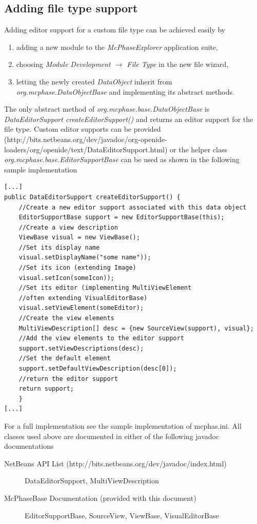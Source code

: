 \documentclass[11pt]{article}
\begin{document}
\subsection{Adding file type support}
Adding editor support for a custom file type can be achieved easily by 
\begin{enumerate}
\item adding a new module to the \emph{McPhaseExplorer} application suite,
\item choosing \emph{Module Development $\rightarrow$ File Type} in the new file wizard,
\item letting the newly created \emph{DataObject} inherit from \emph{org.mcphase.DataObjectBase} and implementing its abstract methods.
\end{enumerate}
The only abstract method of \emph{org.mcphase.base.DataObjectBase} is \emph{DataEditorSupport createEditorSupport()} and returns an editor support for the file type. Custom editor supports can be provided (http://bits.netbeans.org/dev/javadoc/org-openide-loaders/org/openide/text/DataEditorSupport.html) or the helper class \emph{org.mcphase.base.EditorSupportBase} can be used as shown in the following sample implementation
\begin{verbatim}
[...]
public DataEditorSupport createEditorSupport() {
    //Create a new editor support associated with this data object
    EditorSupportBase support = new EditorSupportBase(this);
    //Create a view description
    ViewBase visual = new ViewBase();
    //Set its display name
    visual.setDisplayName("some name"));
    //Set its icon (extending Image)
    visual.setIcon(someIcon));
    //Set its editor (implementing MultiViewElement 
    //often extending VisualEditorBase)
    visual.setViewElement(someEditor);
    //Create the view elements
    MultiViewDescription[] desc = {new SourceView(support), visual};
    //Add the view elements to the editor support
    support.setViewDescriptions(desc);
    //Set the default element
    support.setDefaultViewDescription(desc[0]);
    //return the editor support
    return support;
    }
[...]
\end{verbatim}
For a full implementation see the sample implementation of mcphas.ini. All classes used above are documented in either of the following javadoc documentations
\begin{description}
\item[NetBeans API List (http://bits.netbeans.org/dev/javadoc/index.html)]
DataEditorSupport, MultiViewDescription
\item[McPhaseBase Documentation (provided with this document)]
EditorSupportBase, SourceView, ViewBase, VisualEditorBase
\end{description}
\end{document}
